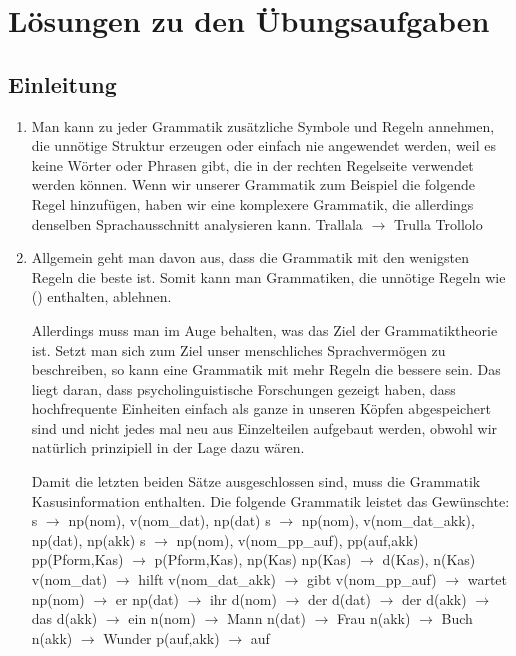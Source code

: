 
\chapter{Lösungen zu den Übungsaufgaben}

\section{Einleitung}

\begin{enumerate}
\item Man kann zu jeder Grammatik zusätzliche Symbole und Regeln annehmen, die unnötige Struktur
  erzeugen oder einfach nie angewendet werden, weil es keine Wörter oder Phrasen gibt, die in der
  rechten Regelseite verwendet werden können. Wenn wir unserer Grammatik zum Beispiel die folgende
  Regel hinzufügen, haben wir eine komplexere Grammatik, die allerdings denselben Sprachausschnitt
  analysieren kann.
\ea
Trallala $\to$ Trulla Trollolo
\z
\item Allgemein geht man davon aus, dass die Grammatik mit den wenigsten Regeln die beste ist. Somit
  kann man Grammatiken, die unnötige Regeln wie () enthalten, ablehnen.

Allerdings muss man im Auge behalten, was das Ziel der Grammatiktheorie ist. Setzt man sich zum Ziel
unser menschliches Sprachvermögen zu beschreiben, so kann eine Grammatik mit mehr Regeln die bessere
sein. Das liegt daran, dass psycholinguistische Forschungen gezeigt haben, dass hochfrequente
Einheiten einfach als ganze in unseren Köpfen abgespeichert sind und nicht jedes mal neu aus
Einzelteilen aufgebaut werden, obwohl wir natürlich prinzipiell in der Lage dazu wären.

Damit die letzten beiden Sätze ausgeschlossen sind, muss die Grammatik Kasusinformation
enthalten. Die folgende Grammatik leistet das Gewünschte:
\eal
\ex s $\to$ np(nom), v(nom\_dat), np(dat)
\ex s $\to$ np(nom), v(nom\_dat\_akk), np(dat), np(akk)
\ex s $\to$ np(nom), v(nom\_pp\_auf), pp(auf,akk)
%
\ex pp(Pform,Kas) $\to$ p(Pform,Kas), np(Kas)
\ex np(Kas) $\to$ d(Kas), n(Kas)
%
\ex v(nom\_dat) $\to$ hilft
\ex v(nom\_dat\_akk) $\to$ gibt
\ex v(nom\_pp\_auf) $\to$ wartet
%
\ex np(nom) $\to$ er
\ex np(dat) $\to$ ihr
%
\ex d(nom) $\to$ der
\ex d(dat) $\to$ der
\ex d(akk) $\to$ das
\ex d(akk) $\to$ ein
%
\ex n(nom) $\to$ Mann
\ex n(dat) $\to$ Frau
\ex n(akk) $\to$ Buch
\ex n(akk) $\to$ Wunder
%
\ex p(auf,akk) $\to$ auf
\zl



\end{enumerate}


